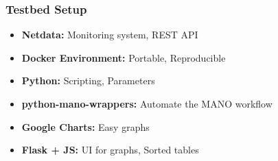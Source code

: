 \begin{frame}
\frametitle{Testbed Setup}
\begin{itemize}[<+->]	
	\item \textbf{Netdata:} Monitoring system, REST API
	\item \textbf{Docker Environment:} Portable, Reproducible
	\item \textbf{Python:} Scripting, Parameters
	\item \textbf{python-mano-wrappers:} Automate the MANO workflow
	\item \textbf{Google Charts:} Easy graphs
	\item \textbf{Flask + JS:} UI for graphs, Sorted tables
\end{itemize}
\end{frame}
